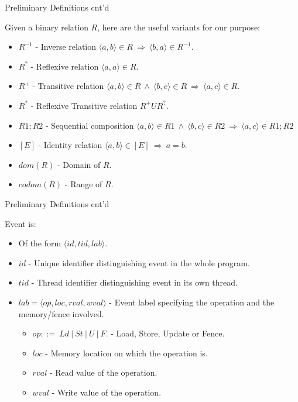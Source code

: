 \documentclass[xcolor={dvipsnames}, notes]{beamer}
\begin{document}
    \begin{frame}{Preliminary Definitions cnt'd}
        
        Given a binary relation $R$, here are the useful variants for our purpose:
        \begin{itemize}
            \item $R^{-1}$ - Inverse relation $\langle a, b\rangle \in R \ \Rightarrow \ \langle b, a\rangle \in R^{-1}$.
            \item $R^{?}$ - Reflexive relation $\langle a, a\rangle \in R$. 
            \item $R^{+}$ - Transitive relation $\langle a, b\rangle \in R \ \wedge \ \langle b, c\rangle \in R \ \Rightarrow \ \langle a, c\rangle \in R$. 
            \item $R^{*}$ - Reflexive Transitive relation $R^{+} U R^{?}$.
            \item $R1;R2$ - Sequential composition $\langle a, b\rangle \in R1 \ \wedge \ \langle b, c\rangle \in R2 \ \Rightarrow \ \langle a, c\rangle \in R1;R2$
            \item $[E]$ - Identity relation $\langle a, b\rangle \in [E] \ \Rightarrow \ a=b$.
            \item $dom(R)$ - Domain of $R$.
            \item $codom(R)$ - Range of $R$.
        \end{itemize}
    
    \end{frame}
    
    \begin{frame}{Preliminary Definitions cnt'd}
        
        Event is:
        \begin{itemize}
            \item Of the form $\langle id, tid, lab \rangle$.
            \item $id$ - Unique identifier distinguishing event in the whole program.
            \item $tid$ - Thread identifier distinguishing event in its own thread.
            \item $lab = \langle op, loc, rval, wval \rangle$ - Event label specifying the operation and the memory/fence involved.  
                \begin{itemize}
                    \item $op ::= \ Ld \ | \ St \ | \ U \ | \ F.$ - Load, Store, Update or Fence.
                    \item $loc$ - Memory location on which the operation is.
                    \item $rval$ - Read value of the operation.
                    \item $wval$ - Write value of the operation. 
                \end{itemize}
        \end{itemize}

    \end{frame}
    
\end{document}
